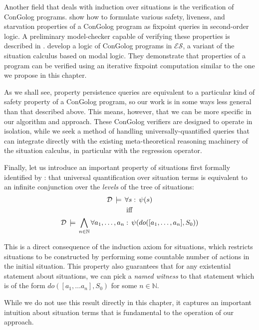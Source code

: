 Another field that deals with induction over situations is the verification
of ConGolog programs. \citet{ternovska97congolog_fixpoint} show how
to formulate various safety, liveness, and starvation properties of
a ConGolog program as fixpoint queries in second-order logic. A preliminary
model-checker capable of verifying these properties is described in
\citep{ternovska02congolog_model_checker}. \citet{classen08golog_properties}
develop a logic of ConGolog programs in $\mathcal{ES}$, a variant
of the situation calculus based on modal logic. They demonstrate that
properties of a program can be verified using an iterative fixpoint
computation similar to the one we propose in this chapter.

As we shall see, property persistence queries are equivalent to a
particular kind of safety property of a ConGolog program, so our work
is in some ways less general than that described above. This means,
however, that we can be more specific in our algorithm and approach.
These ConGolog verifiers are designed to operate in isolation, while
we seek a method of handling universally-quantified queries that can
integrate directly with the existing meta-theoretical reasoning machinery
of the situation calculus, in particular with the regression operator.

Finally, let us introduce an important property of situations first
formally identified by \citet{savelli06sc_quantum_levels}: that universal
quantification over situation terms is equivalent to an infinite conjunction
over the \emph{levels} of the tree of situations:\begin{gather*}
\mathcal{D}\,\models\,\forall s:\,\psi(s)\\
\mathrm{iff}\\
\mathcal{D}\,\models\,\bigwedge_{n\in\mathbb{N}}\forall a_{1},\dots,a_{n}:\,\psi(do([a_{1},\dots,a_{n}],S_{0}))\end{gather*}


This is a direct consequence of the induction axiom for situations,
which restricts situations to be constructed by performing some countable
number of actions in the initial situation. This property also guarantees
that for any existential statement about situations, we can pick a
\emph{named witness} to that statement which is of the form $do([a_{1},\dots a_{n}],S_{0})$
for some $n\in\mathbb{N}$.

While we do not use this result directly in this chapter, it captures
an important intuition about situation terms that is fundamental to
the operation of our approach.


